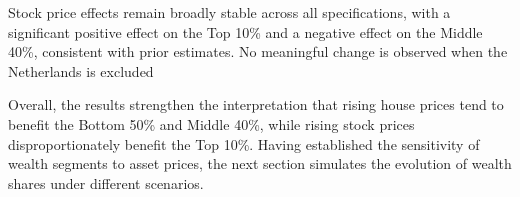 \documentclass[
  a4paper,
  DIV=11,
  numbers=noendperiod]{scrartcl}
\begin{document}
Stock price effects remain broadly stable across all specifications,
with a significant positive effect on the Top 10\% and a negative effect
on the Middle 40\%, consistent with prior estimates. No meaningful
change is observed when the Netherlands is excluded

Overall, the results strengthen the interpretation that rising house
prices tend to benefit the Bottom 50\% and Middle 40\%, while rising
stock prices disproportionately benefit the Top 10\%. Having established
the sensitivity of wealth segments to asset prices, the next section
simulates the evolution of wealth shares under different scenarios.

\begin{table}

\caption{\label{tbl-panelNL}Panel Regression without the Netherlands}


\end{table}%
\end{document}
